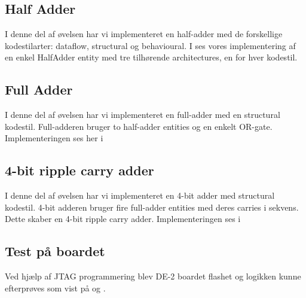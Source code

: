 \subsection{Half Adder}

I denne del af øvelsen har vi implementeret en half-adder med de forskellige
kodestilarter: dataflow, structural og behavioural. I  ses
vores implementering af en enkel HalfAdder entity med tre tilhørende
architectures, en for hver kodestil.


\subsection{Full Adder}

I denne del af øvelsen har vi implementeret en full-adder med en structural
kodestil. Full-adderen bruger to half-adder entities og en enkelt OR-gate.
Implementeringen ses her i 


\subsection{4-bit ripple carry adder}

I denne del af øvelsen  har vi implementeret en 4-bit adder med structural
kodestil. 4-bit adderen bruger fire full-adder entities med deres carries i
sekvens. Dette skaber en 4-bit ripple carry adder. Implementeringen ses i 



\subsection{Test på boardet}

Ved hjælp af JTAG programmering blev DE-2 boardet flashet og logikken kunne
efterprøves som vist på  og .
